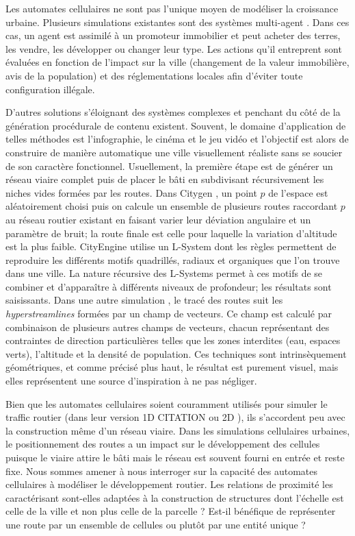 \documentclass[10pt]{article}
\begin{document}
\begin{multicols}{2}
Les automates cellulaires ne sont pas l'unique moyen de modéliser la
croissance urbaine. Plusieurs simulations existantes sont des systèmes
multi-agent \cite{Lechnera,Lechner2004}. Dans ces cas, un agent est
assimilé à un promoteur immobilier et peut acheter des terres, les
vendre, les développer ou changer leur type. Les actions qu'il
entreprent sont évaluées en fonction de l'impact sur la ville
(changement de la valeur immobilière, avis de la population) et des
réglementations locales afin d'éviter toute configuration illégale.

D'autres solutions s'éloignant des systèmes complexes et penchant du
côté de la génération procédurale de contenu existent. Souvent, le
domaine d'application de telles méthodes est l'infographie, le cinéma
et le jeu vidéo et l'objectif est alors de construire de manière
automatique une ville visuellement réaliste sans se soucier de son
caractère fonctionnel. Usuellement, la première étape est de générer
un réseau viaire complet puis de placer le bâti en subdivisant
récursivement les niches vides formées par les routes. Dans Citygen
\cite{Kelly2007}, un point $p$ de l'espace est aléatoirement choisi
puis on calcule un ensemble de plusieurs routes raccordant $p$ au
réseau routier existant en faisant varier leur déviation angulaire et
un paramètre de bruit; la route finale est celle pour laquelle la
variation d'altitude est la plus faible. CityEngine \cite{Parish2001}
utilise un L-System dont les règles permettent de reproduire les
différents motifs quadrillés, radiaux et organiques que l'on trouve
dans une ville. La nature récursive des L-Systems permet à ces motifs
de se combiner et d'apparaître à différents niveaux de profondeur; les
résultats sont saisissants. Dans une autre simulation \cite{Chen2008},
le tracé des routes suit les \textit{hyperstreamlines} formées par un
champ de vecteurs. Ce champ est calculé par combinaison de plusieurs
autres champs de vecteurs, chacun représentant des contraintes de
direction particulières telles que les zones interdites (eau, espaces
verts), l'altitude et la densité de population. Ces techniques sont
intrinsèquement géométriques, et comme précisé plus haut, le résultat
est purement visuel, mais elles représentent une source d'inspiration
à ne pas négliger.

Bien que les automates cellulaires soient couramment utilisés pour
simuler le traffic routier (dans leur version 1D CITATION ou 2D
\cite{Queloz1996}), ils s'accordent peu avec la construction même d'un
réseau viaire. Dans les simulations cellulaires urbaines, le
positionnement des routes a un impact sur le développement des
cellules puisque le viaire attire le bâti mais le réseau est souvent
fourni en entrée et reste fixe. Nous sommes amener à nous interroger
sur la capacité des automates cellulaires à modéliser le développement
routier. Les relations de proximité les caractérisant sont-elles
adaptées à la construction de structures dont l'échelle est celle de
la ville et non plus celle de la parcelle ? Est-il bénéfique de
représenter une route par un ensemble de cellules ou plutôt par une
entité unique ?


\end{multicols}
\end{document}
